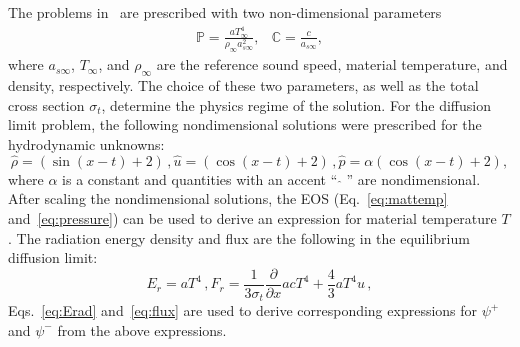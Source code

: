\documentclass[preprint,12pt]{elsarticle}
\newcommand{\dxdy}[2]{\frac{\partial #1}{\partial #2}}
\newcommand{\pec}{\, ,}
\newcommand{\E}{{E_r}}
\newcommand{\F}{{F_r}}
\begin{document}
The problems in~\cite{mcclarren2} are prescribed with two non-dimensional parameters
\begin{equation}
    \label{eq:ndim_params}
    \begin{matrix}
        \mathbb{P} = {\displaystyle \frac{a T_{\infty}^4}{\rho_{\infty} a_{s\infty}^2} }, &  
        \mathbb{C} = {\displaystyle \frac{c}{a_{s\infty}} },
    \end{matrix}
\end{equation}
where $a_{s\infty}$, $T_{\infty}$, and $\rho_{\infty}$ are the reference sound speed,
material temperature, and density, respectively.  The choice of these two parameters, as
well as the total cross section $\sigma_t$, determine the physics regime of the solution.
%
For the diffusion limit problem, the following nondimensional solutions were prescribed
for the hydrodynamic unknowns:
\begin{subequations}
   \begin{equation} 
     \hat \rho = \left(\sin(x - t) + 2\right) \pec
   \end{equation} 
   \begin{equation}
     \hat  u = \left(\cos(x - t) + 2\right) \pec 
   \end{equation} 
   \begin{equation} 
      \hat p = \alpha\left(\cos(x - t) + 2\right) ,
   \end{equation}
\end{subequations}
where $\alpha$ is a constant and quantities with an accent `` $\hat{ }$ '' are nondimensional.  After
scaling the nondimensional solutions, the EOS (Eq.~\eqref{eq:mattemp} and~\eqref{eq:pressure}) can be used
to derive an expression for material temperature $T$.
 The radiation energy density and flux are the following in the equilibrium diffusion limit:
\begin{subequations}
   \begin{equation} 
     \E = aT^4 \pec
   \end{equation}
   \begin{equation} 
       \F = \frac{1}{3\sigma_t}\dxdy{}{x} a c T^4 +
\frac{4}{3} a T^4u 
\pec \end{equation} 
\end{subequations}
Eqs.~\eqref{eq:Erad} and~\eqref{eq:flux} are used to derive corresponding expressions for $\psi^+$ and $\psi^-$ from the above expressions.
\end{document}
